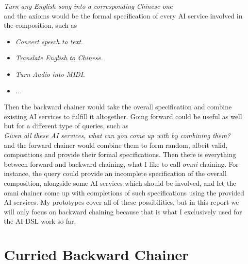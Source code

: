 \documentclass[]{report}
\begin{document}
\emph{Turn any English song into a corresponding Chinese one}\\[0.4cm]
and the axioms would be the formal specification of every AI service
involved in the composition, such as
\begin{itemize}
\item \emph{Convert speech to text.}
\item \emph{Translate English to Chinese.}
\item \emph{Turn Audio into MIDI.}
\item $\dots$
\end{itemize}
Then the backward chainer would take the overall specification and
combine existing AI services to fulfill it altogether.  Going forward
could be useful as well but for a different type of queries, such as\\

\emph{Given all these AI services, what can you come up with by
combining them?}\\[0.4cm] and the forward chainer would combine them
to form random, albeit valid, compositions and provide their formal
specifications.  Then there is everything between forward and backward
chaining, what I like to call \emph{omni} chaining.  For instance, the
query could provide an incomplete specification of the overall
composition, alongside some AI services which should be involved, and
let the omni chainer come up with completions of such specifications
using the provided AI services.  My prototypes cover all of these
possibilities, but in this report we will only focus on backward
chaining because that is what I exclusively used for the AI-DSL work
so far.
\section{Curried Backward Chainer}
\label{sec:curriedbc}
\end{document}
